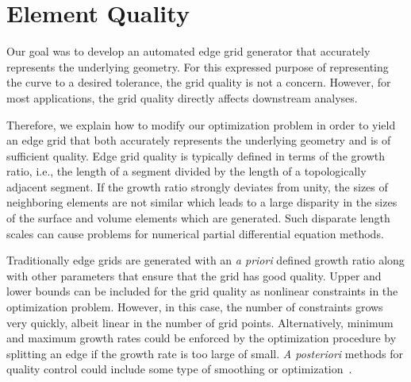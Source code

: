 \section{Element Quality}
Our goal was to develop an automated edge grid generator that accurately 
represents the underlying geometry.  For this expressed purpose of 
representing the curve to a desired tolerance, the grid quality 
is not a concern.  However, for most applications, the grid quality 
directly affects downstream analyses.

Therefore, we explain how to modify our optimization problem in order to 
yield an edge grid that both accurately represents the underlying geometry 
and is of sufficient quality.  Edge grid quality is typically defined in 
terms of the growth ratio, i.e., the length of a segment divided by the 
length of a topologically adjacent segment.  If the growth ratio strongly 
deviates from unity, the sizes of neighboring elements are not 
similar which leads to a large disparity in the sizes of the surface and 
volume elements which are generated.  Such disparate length scales can 
cause problems for numerical partial differential equation methods.

Traditionally edge grids are generated with an {\it{a priori}} defined 
growth ratio along with other parameters that ensure that the grid has 
good quality.  Upper and lower bounds can be included for the grid 
quality as nonlinear constraints in the optimization problem.  However, in 
this case, the number of constraints grows very quickly, albeit 
linear in the number of grid points.  Alternatively, minimum and maximum 
growth rates could be enforced by the optimization procedure by splitting 
an edge if the growth rate is too large of small.  {\it{A posteriori}} 
methods for quality control could include some type of 
smoothing or optimization~\cite{lori_pat,feasnewt,multiobjective,logbarrier}.

